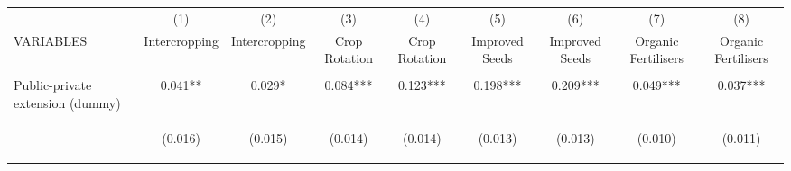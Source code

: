 \begin{center}
\begin{tabular}{lcccccccc} \hline
 & (1) & (2) & (3) & (4) & (5) & (6) & (7) & (8) \\
VARIABLES & Intercropping & Intercropping & Crop Rotation & Crop Rotation & Improved Seeds & Improved Seeds & Organic Fertilisers & Organic Fertilisers \\ \hline
\vspace{4pt} & \begin{footnotesize}\end{footnotesize} & \begin{footnotesize}\end{footnotesize} & \begin{footnotesize}\end{footnotesize} & \begin{footnotesize}\end{footnotesize} & \begin{footnotesize}\end{footnotesize} & \begin{footnotesize}\end{footnotesize} & \begin{footnotesize}\end{footnotesize} & \begin{footnotesize}\end{footnotesize} \\
Public-private extension (dummy) & 0.041** & 0.029* & 0.084*** & 0.123*** & 0.198*** & 0.209*** & 0.049*** & 0.037*** \\
\vspace{4pt} & \begin{footnotesize}(0.016)\end{footnotesize} & \begin{footnotesize}(0.015)\end{footnotesize} & \begin{footnotesize}(0.014)\end{footnotesize} & \begin{footnotesize}(0.014)\end{footnotesize} & \begin{footnotesize}(0.013)\end{footnotesize} & \begin{footnotesize}(0.013)\end{footnotesize} & \begin{footnotesize}(0.010)\end{footnotesize} & \begin{footnotesize}(0.011)\end{footnotesize} \\

\end{tabular}
\end{center}

